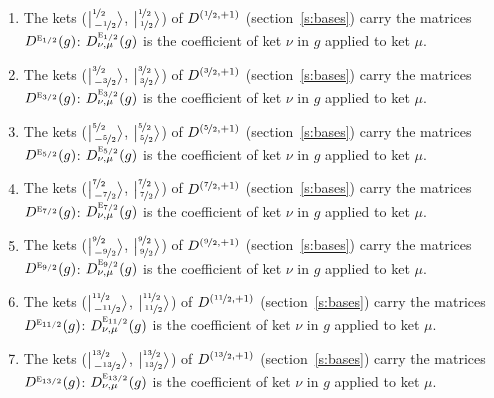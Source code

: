 \documentclass[10pt,a4paper]{article}
\numberwithin{equation}{section}
\newcommand{\irr}[1]{\text{\normalfont\scshape #1}}
\newcommand{\irrJp}[2]{D^{(#1,#2)}}
\newcommand{\repD}[1]{D^{#1}}
\newcommand{\intx}{\mu}
\newcommand{\jm}[2]{\bigl\lvert{}^{#1}_{\,#2}\bigr\rangle}
\newenvironment{romanlist}{\begin{enumerate}%
\renewcommand{\labelenumi}{(\roman{enumi})}}%
  {\end{enumerate}}
\begin{document}
\begin{romanlist}\raggedright
\item The kets ($\jm{\nicefrac{1}{2}}{-\nicefrac{1}{2}}$, $\jm{\nicefrac{1}{2}}{\nicefrac{1}{2}}$) of $\irrJp{\nicefrac{1}{2}}{+1}$ (section~\ref{s:bases}) carry the matrices $\repD{\irr{e}_{1/2}}(g)$: $\repD{\irr{e}_{1/2}}_{\nu,\intx}(g)$ is the coefficient of ket $\nu$ in $g$ applied to ket $\intx$.
\item The kets ($\jm{\nicefrac{3}{2}}{-\nicefrac{3}{2}}$, $\jm{\nicefrac{3}{2}}{\nicefrac{3}{2}}$) of $\irrJp{\nicefrac{3}{2}}{+1}$ (section~\ref{s:bases}) carry the matrices $\repD{\irr{e}_{3/2}}(g)$: $\repD{\irr{e}_{3/2}}_{\nu,\intx}(g)$ is the coefficient of ket $\nu$ in $g$ applied to ket $\intx$.
\item The kets ($\jm{\nicefrac{5}{2}}{-\nicefrac{5}{2}}$, $\jm{\nicefrac{5}{2}}{\nicefrac{5}{2}}$) of $\irrJp{\nicefrac{5}{2}}{+1}$ (section~\ref{s:bases}) carry the matrices $\repD{\irr{e}_{5/2}}(g)$: $\repD{\irr{e}_{5/2}}_{\nu,\intx}(g)$ is the coefficient of ket $\nu$ in $g$ applied to ket $\intx$.
\item The kets ($\jm{\nicefrac{7}{2}}{-\nicefrac{7}{2}}$, $\jm{\nicefrac{7}{2}}{\nicefrac{7}{2}}$) of $\irrJp{\nicefrac{7}{2}}{+1}$ (section~\ref{s:bases}) carry the matrices $\repD{\irr{e}_{7/2}}(g)$: $\repD{\irr{e}_{7/2}}_{\nu,\intx}(g)$ is the coefficient of ket $\nu$ in $g$ applied to ket $\intx$.
\item The kets ($\jm{\nicefrac{9}{2}}{-\nicefrac{9}{2}}$, $\jm{\nicefrac{9}{2}}{\nicefrac{9}{2}}$) of $\irrJp{\nicefrac{9}{2}}{+1}$ (section~\ref{s:bases}) carry the matrices $\repD{\irr{e}_{9/2}}(g)$: $\repD{\irr{e}_{9/2}}_{\nu,\intx}(g)$ is the coefficient of ket $\nu$ in $g$ applied to ket $\intx$.
\item The kets ($\jm{\nicefrac{11}{2}}{-\nicefrac{11}{2}}$, $\jm{\nicefrac{11}{2}}{\nicefrac{11}{2}}$) of $\irrJp{\nicefrac{11}{2}}{+1}$ (section~\ref{s:bases}) carry the matrices $\repD{\irr{e}_{11/2}}(g)$: $\repD{\irr{e}_{11/2}}_{\nu,\intx}(g)$ is the coefficient of ket $\nu$ in $g$ applied to ket $\intx$.
\item The kets ($\jm{\nicefrac{13}{2}}{-\nicefrac{13}{2}}$, $\jm{\nicefrac{13}{2}}{\nicefrac{13}{2}}$) of $\irrJp{\nicefrac{13}{2}}{+1}$ (section~\ref{s:bases}) carry the matrices $\repD{\irr{e}_{13/2}}(g)$: $\repD{\irr{e}_{13/2}}_{\nu,\intx}(g)$ is the coefficient of ket $\nu$ in $g$ applied to ket $\intx$.
\end{romanlist}
\end{document}
